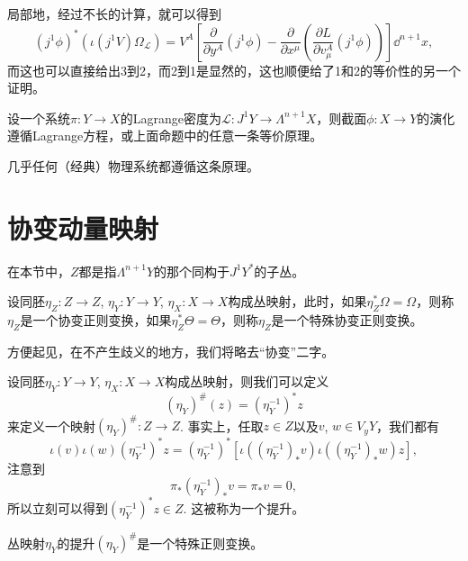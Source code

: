 局部地，经过不长的计算，就可以得到
\[
    (j^1\phi)^*(\iota(j^1V)\Omega_{\mathcal L})=V^A\left[\frac{\partial}{\partial y^A}(j^1\phi)-\frac{\partial}{\partial x^\mu}\left(\frac{\partial L}{\partial v^A_\mu}(j^1\phi)\right)\right]\dd^{n+1}x,
\]
而这也可以直接给出3到2，而2到1是显然的，这也顺便给了1和2的等价性的另一个证明。

\begin{para}[动力学原理]
    设一个系统$\pi:Y\to X$的Lagrange密度为$\mathcal{L}:J^1Y\to \Lambda^{n+1}X$，则截面$\phi:X\to Y$的演化遵循Lagrange方程，或上面命题中的任意一条等价原理。
\end{para}

几乎任何（经典）物理系统都遵循这条原理。

\section{协变动量映射}

在本节中，$Z$都是指$\Lambda^{n+1}Y$的那个同构于$J^1Y^*$的子丛。

\begin{para}[协变正则变换]
    设同胚$\eta_Z:Z\to Z$, $\eta_Y:Y\to Y$, $\eta_X:X\to X$构成丛映射，此时，如果$\eta_Z^*\Omega=\Omega$，则称$\eta_Z$是一个协变正则变换，如果$\eta_Z^*\Theta=\Theta$，则称$\eta_Z$是一个特殊协变正则变换。
\end{para}

方便起见，在不产生歧义的地方，我们将略去“协变”二字。

\begin{para}
    设同胚$\eta_Y:Y\to Y$, $\eta_X:X\to X$构成丛映射，则我们可以定义
    \[
        (\eta_Y)^\#(z)=(\eta_Y^{-1})^*z
    \]
    来定义一个映射$(\eta_Y)^\#:Z\to Z$. 事实上，任取$z\in Z$以及$v$, $w\in V_yY$，我们都有
    \[
        \iota(v)\iota(w)(\eta_Y^{-1})^*z=(\eta_Y^{-1})^*\left[\iota((\eta_Y^{-1})_*v)\iota((\eta_Y^{-1})_*w)z\right],
    \]
    注意到
    \[
        \pi_*(\eta_Y^{-1})_*v=\pi_*v=0,
    \]
    所以立刻可以得到$(\eta_Y^{-1})^*z\in Z$. 这被称为一个提升。
\end{para}

\begin{pro}
    丛映射$\eta_Y$的提升$(\eta_Y)^\#$是一个特殊正则变换。
\end{pro}

